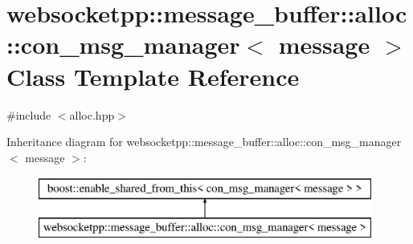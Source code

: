 \hypertarget{classwebsocketpp_1_1message__buffer_1_1alloc_1_1con__msg__manager}{}\section{websocketpp\+:\+:message\+\_\+buffer\+:\+:alloc\+:\+:con\+\_\+msg\+\_\+manager$<$ message $>$ Class Template Reference}
\label{classwebsocketpp_1_1message__buffer_1_1alloc_1_1con__msg__manager}


{\ttfamily \#include $<$alloc.\+hpp$>$}

Inheritance diagram for websocketpp\+:\+:message\+\_\+buffer\+:\+:alloc\+:\+:con\+\_\+msg\+\_\+manager$<$ message $>$\+:\begin{figure}[H]
\begin{center}
\leavevmode
\includegraphics[height=2.000000cm]{classwebsocketpp_1_1message__buffer_1_1alloc_1_1con__msg__manager}
\end{center}
\end{figure}
